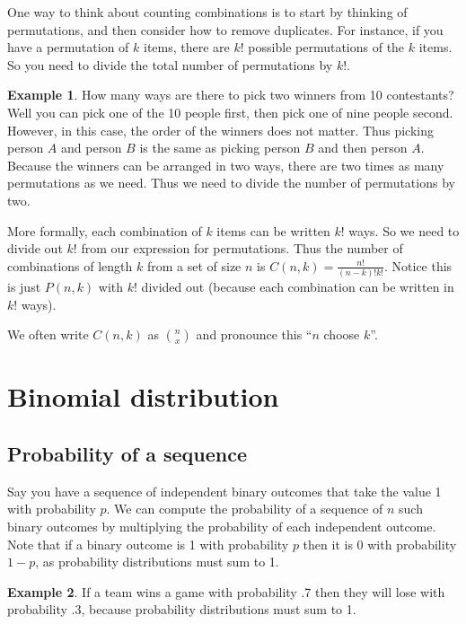\documentclass[]{article}
\theoremstyle{definition}
\newtheorem{exmp}{Example}[section]
\begin{document}
\noindent One way to think about counting combinations is to start by thinking of permutations, and then consider how to remove duplicates. For instance, if you have a permutation of $k$ items, there are $k!$ possible permutations of the $k$ items. So you need to divide the total number of permutations by $k!$.

\begin{exmp}
How many ways are there to pick two winners from 10 contestants? Well you can pick one of the 10 people first, then pick one of nine people second. However, in this case, the order of the winners does not matter. Thus picking person $A$ and person $B$ is the same as picking person $B$ and then person $A$. Because the winners can be arranged in two ways, there are two times as many permutations as we need. Thus we need to divide the number of permutations by two. 
\end{exmp} 

\noindent More formally, each combination of $k$ items can be written $k!$ ways. So we need to divide out $k!$ from our expression for permutations. Thus the number of combinations of length $k$ from a set of size $n$ is $C(n,k) = \frac{n!}{(n-k)!k!}$. Notice this is just $P(n,k)$ with $k!$ divided out (because each combination can be written in $k!$ ways).

We often write $C(n,k)$ as  ${n \choose x} $ and pronounce this ``$n$ choose $k$''.

\section{Binomial distribution}
 
 \subsection{Probability of a sequence}
 
Say you have a sequence of independent binary outcomes that take the value 1 with probability $p$. We can compute the probability of a sequence of $n$ such binary outcomes by multiplying the probability of each independent outcome. Note that if a binary outcome is 1 with probability $p$ then it is 0 with probability $1-p$, as probability distributions must sum to 1.

\begin{exmp}
If a team wins a game with probability .7 then they will lose with probability .3, because probability distributions must sum to 1.
\end{exmp}
\end{document}
